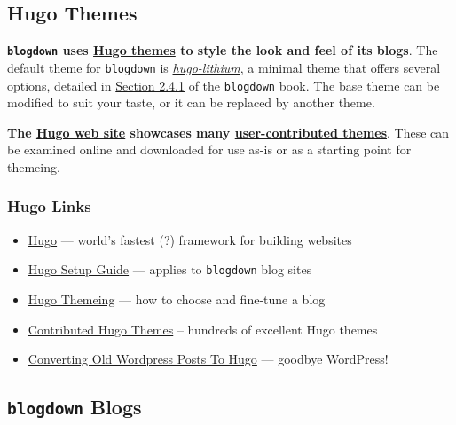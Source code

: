 \documentclass[]{book}
\providecommand{\tightlist}{%
  \setlength{\itemsep}{0pt}\setlength{\parskip}{0pt}}
\theoremstyle{definition}
\theoremstyle{definition}
\theoremstyle{definition}
\theoremstyle{remark}
\begin{document}
\hypertarget{hugo-themes}{%
\subsection{Hugo Themes}\label{hugo-themes}}

\textbf{\texttt{blogdown} uses \href{https://gohugo.io/themes/}{Hugo
themes} to style the look and feel of its blogs}. The default theme for
\texttt{blogdown} is
\href{https://github.com/yihui/hugo-lithium}{\emph{hugo-lithium}}, a
minimal theme that offers several options, detailed in
\href{https://bookdown.org/yihui/blogdown/themes.html\#the-default-theme}{Section
2.4.1} of the \texttt{blogdown} book. The base theme can be modified to
suit your taste, or it can be replaced by another theme.

\textbf{The \href{https://gohugo.io/}{Hugo web site} showcases many
\href{https://themes.gohugo.io}{user-contributed themes}}. These can be
examined online and downloaded for use as-is or as a starting point for
themeing.

\hypertarget{hugo-links}{%
\subsubsection{Hugo Links}\label{hugo-links}}

\begin{itemize}
\tightlist
\item
  \href{https://gohugo.io/}{Hugo} --- world's fastest (?) framework for
  building websites
\item
  \href{https://gohugo.io/getting-started/installing/}{Hugo Setup Guide}
  --- applies to \texttt{blogdown} blog sites
\item
  \href{https://gohugo.io/themes/}{Hugo Themeing} --- how to choose and
  fine-tune a blog
\item
  \href{https://themes.gohugo.io}{Contributed Hugo Themes} -- hundreds
  of excellent Hugo themes
\item
  \href{https://riinu.netlify.com/2018/02/converting-old-wordpress-posts-to-hugo/}{Converting
  Old Wordpress Posts To Hugo} --- goodbye WordPress!
\end{itemize}

\hypertarget{blogdown-blogs}{%
\subsection{\texorpdfstring{\texttt{blogdown}
Blogs}{blogdown Blogs}}\label{blogdown-blogs}}
\end{document}
